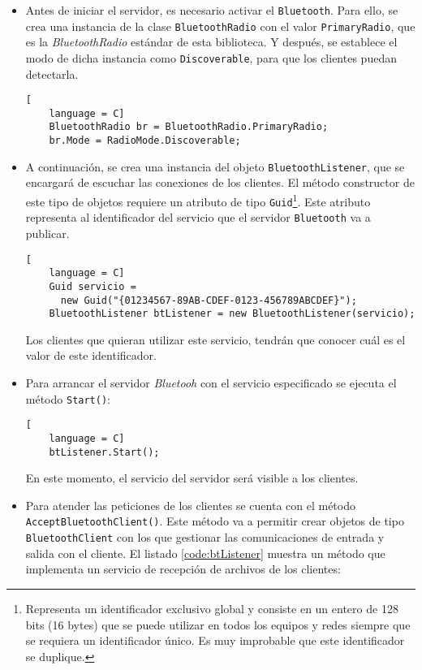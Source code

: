 \begin{itemize}
\item Antes de iniciar el servidor, es necesario activar el \texttt{Bluetooth}.
Para ello, se crea una instancia de la clase \texttt{BluetoothRadio} con
el valor \texttt{PrimaryRadio}, que es la \emph{BluetoothRadio} estándar de
esta biblioteca. Y después, se establece el modo de dicha instancia como
\texttt{Discoverable}, para que los clientes puedan detectarla.

  \begin{lstlisting}[
    language = C]
    BluetoothRadio br = BluetoothRadio.PrimaryRadio;
    br.Mode = RadioMode.Discoverable;
  \end{lstlisting}

\item A continuación, se crea una instancia del objeto
\texttt{BluetoothListener}, que se encargará de escuchar las conexiones de los
clientes. El método constructor de este tipo de objetos requiere un atributo
de tipo \texttt{Guid}\footnote{Representa un identificador exclusivo global y 
consiste en un entero de 128 bits (16 bytes) que se puede utilizar en todos los 
equipos y redes siempre que se requiera un identificador único. Es muy 
improbable que este identificador se duplique.}. Este atributo representa al 
identificador del servicio que el servidor \texttt{Bluetooth} va a publicar.

  \begin{lstlisting}[
    language = C]
    Guid servicio = 
      new Guid("{01234567-89AB-CDEF-0123-456789ABCDEF}");
    BluetoothListener btListener = new BluetoothListener(servicio);
  \end{lstlisting}

Los clientes que quieran utilizar este servicio, tendrán que conocer cuál
es el valor de este identificador.

\item Para arrancar el servidor \emph{Bluetooh} con el servicio especificado
se ejecuta el método \texttt{Start()}:

  \begin{lstlisting}[
    language = C]
    btListener.Start();
  \end{lstlisting}

En este momento, el servicio del servidor será visible a los clientes.

\item Para atender las peticiones de los clientes se cuenta con el método
\texttt{AcceptBluetoothClient()}. Este método va a permitir crear objetos
de tipo \texttt{BluetoothClient} con los que gestionar las comunicaciones
de entrada y salida con el cliente. El listado \ref{code:btListener}
muestra un método que implementa un servicio de recepción de archivos de
los clientes:


\end{itemize}
